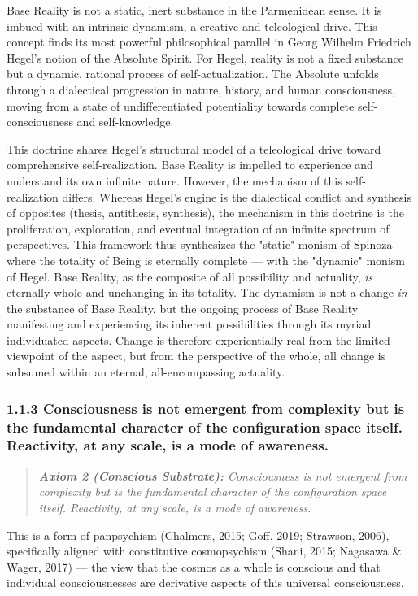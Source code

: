 Base Reality is not a static, inert substance in the Parmenidean sense. It is imbued with an intrinsic dynamism, a creative and teleological drive. This concept finds its most powerful philosophical parallel in Georg Wilhelm Friedrich Hegel's notion of the Absolute Spirit. For Hegel, reality is not a fixed substance but a dynamic, rational process of self-actualization. The Absolute unfolds through a dialectical progression in nature, history, and human consciousness, moving from a state of undifferentiated potentiality towards complete self-consciousness and self-knowledge.


This doctrine shares Hegel's structural model of a teleological drive toward comprehensive self-realization. Base Reality is impelled to experience and understand its own infinite nature. However, the mechanism of this self-realization differs. Whereas Hegel's engine is the dialectical conflict and synthesis of opposites (thesis, antithesis, synthesis), the mechanism in this doctrine is the proliferation, exploration, and eventual integration of an infinite spectrum of perspectives. This framework thus synthesizes the "static" monism of Spinoza — where the totality of Being is eternally complete — with the "dynamic" monism of Hegel. Base Reality, as the composite of all possibility and actuality, \textit{is} eternally whole and unchanging in its totality. The dynamism is not a change \textit{in} the substance of Base Reality, but the ongoing process of Base Reality manifesting and experiencing its inherent possibilities through its myriad individuated aspects. Change is therefore experientially real from the limited viewpoint of the aspect, but from the perspective of the whole, all change is subsumed within an eternal, all-encompassing actuality.


\subsubsection*{1.1.3 Consciousness is not emergent from complexity but is the fundamental character of the configuration space itself. Reactivity, at any scale, is a mode of awareness.}


\begin{quote}
\itshape
\textbf{Axiom 2 (Conscious Substrate):} \textit{Consciousness is not emergent from complexity but is the fundamental character of the configuration space itself. Reactivity, at any scale, is a mode of awareness.}
\end{quote}


This is a form of panpsychism (Chalmers, 2015; Goff, 2019; Strawson, 2006), specifically aligned with constitutive cosmopsychism (Shani, 2015; Nagasawa \& Wager, 2017) — the view that the cosmos as a whole is conscious and that individual consciousnesses are derivative aspects of this universal consciousness.



